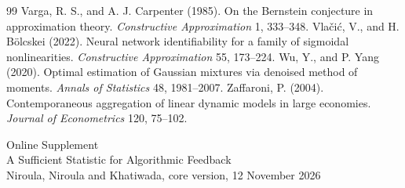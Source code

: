 \documentclass[12pt]{article}
\theoremstyle{definition}
\theoremstyle{remark}
\begin{document}
\begin{thebibliography}{99}
 Varga, R. S., and A. J. Carpenter (1985). On the Bernstein conjecture in approximation theory. \emph{Constructive Approximation} 1, 333--348.
 Vla\v{c}i\'c, V., and H. B\"olcskei (2022). Neural network identifiability for a family of sigmoidal nonlinearities. \emph{Constructive Approximation} 55, 173--224.
 Wu, Y., and P. Yang (2020). Optimal estimation of Gaussian mixtures via denoised method of moments. \emph{Annals of Statistics} 48, 1981--2007.
 Zaffaroni, P. (2004). Contemporaneous aggregation of linear dynamic models in large economies. \emph{Journal of Econometrics} 120, 75--102.
\end{thebibliography}
\appendix
\clearpage
\singlespacing\small\sloppy
\renewcommand{\topfraction}{0.9}\renewcommand{\bottomfraction}{0.8}\renewcommand{\textfraction}{0.07}\renewcommand{\floatpagefraction}{0.75}
\setcounter{page}{1}\setcounter{table}{0}\setcounter{figure}{0}
\begin{center}{\Large Online Supplement}\\[4pt]{\large A Sufficient Statistic for Algorithmic Feedback}\\[2pt]{\normalsize Niroula, Niroula and Khatiwada, core version, 12 November 2026}\end{center}
\end{document}
